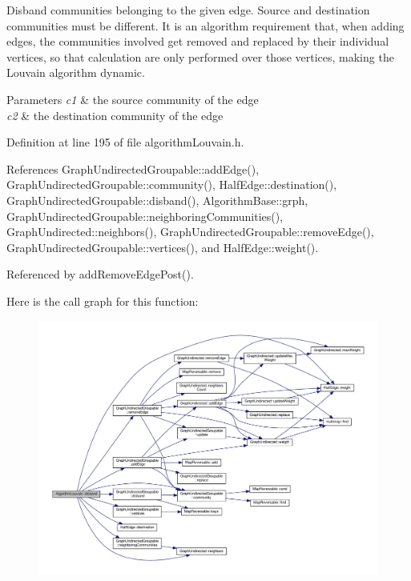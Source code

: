 Disband communities belonging to the given edge. Source and destination communities must be different. It is an algorithm requirement that, when adding edges, the communities involved get removed and replaced by their individual vertices, so that calculation are only performed over those vertices, making the Louvain algorithm dynamic. 
\begin{DoxyParams}{Parameters}
{\em c1} & the source community of the edge \\
\hline
{\em c2} & the destination community of the edge \\
\hline
\end{DoxyParams}


Definition at line 195 of file algorithm\+Louvain.\+h.



References Graph\+Undirected\+Groupable\+::add\+Edge(), Graph\+Undirected\+Groupable\+::community(), Half\+Edge\+::destination(), Graph\+Undirected\+Groupable\+::disband(), Algorithm\+Base\+::grph, Graph\+Undirected\+Groupable\+::neighboring\+Communities(), Graph\+Undirected\+::neighbors(), Graph\+Undirected\+Groupable\+::remove\+Edge(), Graph\+Undirected\+Groupable\+::vertices(), and Half\+Edge\+::weight().



Referenced by add\+Remove\+Edge\+Post().

Here is the call graph for this function\+:
\nopagebreak
\begin{figure}[H]
\begin{center}
\leavevmode
\includegraphics[width=350pt]{classAlgorithmLouvain_a1e38f3c6a2df8b028328131b3dfceb94_cgraph}
\end{center}
\end{figure}
\mbox{\label{classAlgorithmLouvain_aa4b25143d94b4fabc830ea053b76dd7d}} 
